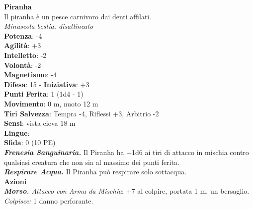 \begin{multicols}{2}
\medskip\textbf{Piranha}\\
Il piranha è un pesce carnivoro dai denti affilati.\\
\emph{Minuscola bestia, disallineato}\\
\textbf{Potenza}: -4\\
\textbf{Agilità}: +3\\
\textbf{Intelletto}: -2\\
\textbf{Volontà}: -2\\
\textbf{Magnetismo}: -4\\
\textbf{Difesa}: 15 - \textbf{Iniziativa}: +3\\
\textbf{Punti Ferita}: 1 (1d4 - 1)\\
\textbf{Movimento}: 0 m, nuoto 12 m\\
\textbf{Tiri Salvezza}: Tempra -4, Riflessi +3, Arbitrio -2 \\
\textbf{Sensi}: vista cieva 18 m\\
\textbf{Lingue}: -\\
\textbf{Sfida}: 0 (10 PE)\smallskip\\
\emph{\textbf{Frenesia Sanguinaria.}} Il Piranha ha +1d6 ai tiri di attacco in mischia contro qualsiasi creatura che non sia al massimo dei punti ferita.\\
\emph{\textbf{Respirare Acqua.}} Il Piranha può respirare solo sottacqua.\\ \smallskip\textbf{Azioni}\\
\emph{\textbf{Morso.} Attacco con Arma da Mischia}: +7 al colpire, portata 1 m, un bersaglio.
\emph{Colpisce:} 1 danno perforante.\\


\end{multicols}
